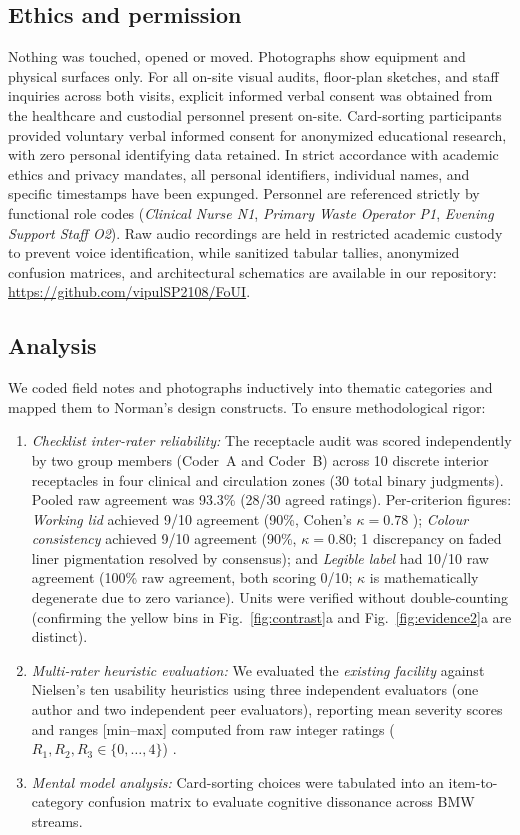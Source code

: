 \documentclass[10pt,twocolumn,a4paper]{article}
\begin{document}
\subsection{Ethics and permission}
Nothing was touched, opened or moved. Photographs show equipment and physical surfaces only. For all on-site visual audits, floor-plan sketches, and staff inquiries across both visits, explicit informed verbal consent was obtained from the healthcare and custodial personnel present on-site. Card-sorting participants provided voluntary verbal informed consent for anonymized educational research, with zero personal identifying data retained. In strict accordance with academic ethics and privacy mandates, all personal identifiers, individual names, and specific timestamps have been expunged. Personnel are referenced strictly by functional role codes (\emph{Clinical Nurse N1}, \emph{Primary Waste Operator P1}, \emph{Evening Support Staff O2}). Raw audio recordings are held in restricted academic custody to prevent voice identification, while sanitized tabular tallies, anonymized confusion matrices, and architectural schematics are available in our repository: \url{https://github.com/vipulSP2108/FoUI}.

\subsection{Analysis}
We coded field notes and photographs inductively into thematic categories \cite{braun2006} and mapped them to Norman's design constructs. To ensure methodological rigor:
\begin{enumerate}
\item \emph{Checklist inter-rater reliability:} The receptacle audit was scored independently by two group members (Coder~A and Coder~B) across 10 discrete interior receptacles in four clinical and circulation zones (30 total binary judgments). Pooled raw agreement was 93.3\% (28/30 agreed ratings). Per-criterion figures: \emph{Working lid} achieved 9/10 agreement (90\%, Cohen's $\kappa = 0.78$ \cite{cohen1960}); \emph{Colour consistency} achieved 9/10 agreement (90\%, $\kappa = 0.80$; 1 discrepancy on faded liner pigmentation resolved by consensus); and \emph{Legible label} had 10/10 raw agreement (100\% raw agreement, both scoring 0/10; $\kappa$ is mathematically degenerate due to zero variance). Units were verified without double-counting (confirming the yellow bins in Fig.~\ref{fig:contrast}a and Fig.~\ref{fig:evidence2}a are distinct).
\item \emph{Multi-rater heuristic evaluation:} We evaluated the \emph{existing facility} against Nielsen's ten usability heuristics \cite{nielsen1990,nielsen1994} using three independent evaluators (one author and two independent peer evaluators), reporting mean severity scores and ranges [min--max] computed from raw integer ratings ($R_1, R_2, R_3 \in \{0,\dots,4\}$) \cite{nielsen1993}.
\item \emph{Mental model analysis:} Card-sorting choices were tabulated into an item-to-category confusion matrix to evaluate cognitive dissonance across BMW streams.
\end{enumerate}
\end{document}
